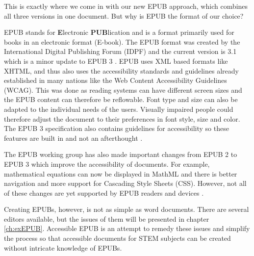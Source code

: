 \documentclass{llncs}
\begin{document}
This is exactly where we come in with our new EPUB approach, which combines all three versions in one document. But why is EPUB the format of our choice?

EPUB stands for {\bf E}lectronic {\bf PUB}lication and is a format primarily used for books in an electronic format (E-book). The EPUB format was created by the International Digital Publishing Forum (IDPF) and the current version is 3.1 which is a minor update to EPUB 3 \cite{EPUBspecs}. EPUB uses XML based formats like XHTML, and thus also uses the accessibility standards and guidelines already established in many nations like the Web Content Accessibility Guidelines (WCAG)\cite{WCAG}. This was done as reading systems can have different screen sizes and the EPUB content can therefore be reflowable. Font type and size can also be adapted to the individual needs of the users. Visually impaired people could therefore adjust the document to their preferences in font style, size and color. The EPUB 3 specification also contains guidelines for accessibility so these features are built in and not an afterthought \cite{EPUB3bp}.

The EPUB working group has also made important changes from EPUB 2 to EPUB 3 which improve the accessibility of documents. For example, mathematical equations can now be displayed in MathML and there is better navigation and more support for Cascading Style Sheets (CSS). However, not all of these changes are yet supported by EPUB readers and devices \cite{EPUB30changes}. 

Creating EPUBs, however, is not as simple as word documents. There are several editors available, but the issues of them will be presented in chapter \ref{ch:exEPUB}. Accessible EPUB is an attempt to remedy these issues and simplify the process so that accessible documents for STEM subjects can be created without intricate knowledge of EPUBs.
\end{document}
